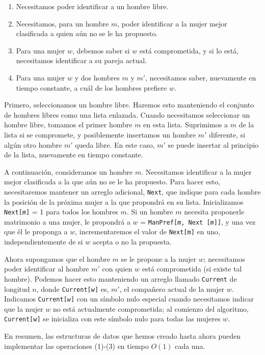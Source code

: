 \documentclass[a4paper, 12pt]{book}
\theoremstyle{dotless}
\begin{document}
\begin{enumerate}
 \item Necesitamos poder identificar a un hombre libre. 
 \item Necesitamos, para un hombre $m$, poder identificar a la mujer mejor clasificada a quien aún no se le ha propuesto.
 \item Para una mujer $w$, debemos saber si $w$ está comprometida, y si lo está, necesitamos identificar a su pareja actual.
 \item Para una mujer $w$ y dos hombres $m$ y $m'$, necesitamos saber, nuevamente en tiempo constante, a cuál de los hombres prefiere $w$.
\end{enumerate}

Primero, seleccionamos un hombre libre. Haremos esto manteniendo el conjunto de hombres libres como una lista enlazada. Cuando necesitamos seleccionar un hombre libre, tomamos el primer hombre $m$ en esta lista. Suprimimos a $m$ de la lista si se compromete, y posiblemente insertamos un hombre $m'$ diferente, si algún otro hombre $m'$ queda libre. En este caso, $m'$ se puede insertar al principio de la lista, nuevamente en tiempo constante.

A continuación, consideramos un hombre $m$. Necesitamos identificar a la mujer mejor clasificada a la que aún no se le ha propuesto. Para hacer esto, necesitaremos mantener un arreglo adicional, \texttt{Next}, que indique para cada hombre la posición de la próxima mujer a la que propondrá en su lista. Inicializamos \texttt{Next[\textit{m}]} = 1 para todos los hombres $m$. Si un hombre $m$ necesita proponerle matrimonio a una mujer, le propondrá a $w$ = \texttt{ManPref[\textit{m}, Next [\textit{m}]]}, y una vez que él le proponga a $w$, incrementaremos el valor de \texttt{Next[m]} en uno, independientemente de si $w$ acepta o no la propuesta.

Ahora supongamos que el hombre $m$ se le propone a la mujer $w$; necesitamos poder identificar al hombre $m'$ con quien $w$ está comprometida (si existe tal hombre). Podemos hacer esto manteniendo un arreglo llamado \texttt{Current} de longitud $n$, donde \texttt{Current[\textit{w}]} es, $m'$, el compañero actual de la mujer $w$. Indicamos \texttt{Current[\textit{w}]} con un símbolo nulo especial cuando necesitamos indicar que la mujer $w$ no está actualmente comprometida; al comienzo del algoritmo, \texttt{Current[w]} se inicializa con este símbolo nulo para todas las mujeres $w$.

En resumen, las estructuras de datos que hemos creado hasta ahora pueden implementar las operaciones (1)-(3) en tiempo $O(1)$ cada una. 
\end{document}
